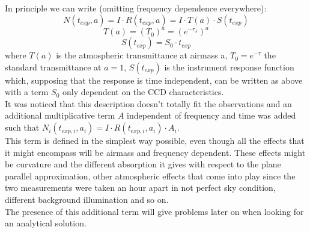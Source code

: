\documentclass[a4paper]{article}
\begin{document}
\begin{multicols}{2}
			In principle we can write (omitting frequency dependence everywhere):
			\begin{equation}
				N(t_{exp}, a) = I \cdot R(t_{exp}, a) = I \cdot T(a) \cdot S(t_{exp})
			\end{equation}
			\begin{equation}
				T(a) = (T_0)^a = (e^{-\tau_{\lambda}})^a
			\end{equation}
			\begin{equation}
				S(t_{exp}) = S_0 \cdot t_{exp}
			\end{equation}
			where $T(a)$ is the atmospheric transmittance at airmass a, $T_0 = e^{-\tau}$ the standard transmittance at $a = 1$, $S(t_{exp})$ is the instrument response function which, supposing that the response is time independent, can be written as above with a term $S_0$ only dependent on the CCD characteristics.\\
			
			It was noticed that this description doesn't totally fit the observations and an additional multiplicative term $A$ independent of frequency and time was added such that $N_i(t_{exp,i}, a_i) = I \cdot R(t_{exp,i}, a_i) \cdot A_i$.\\
			This term is defined in the simplest way possible, even though all the effects that it might encompass will be airmass and frequency dependent. These effects might be curvature and the different absorption it gives with respect to the plane parallel approximation, other atmospheric effects that come into play since the two measurements were taken an hour apart in not perfect sky condition, different background illumination and so on.\\
			The presence of this additional term will give problems later on when looking for an analytical solution.\\
			

\end{multicols}
\end{document}
